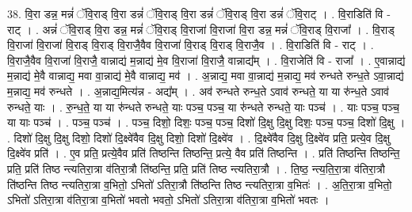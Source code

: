 \documentclass[17pt]{extarticle}
\begin{document}
38. वि॒रा डन्न॒ मन्नं॑ ॅवि॒राड् वि॒रा डन्नं॑ ॅवि॒राड् वि॒रा डन्नं॑ ॅवि॒राड् वि॒रा डन्नं॑ ॅवि॒राट् । . वि॒राडिति॑ वि - राट् । . अन्नं॑ ॅवि॒राड् वि॒रा डन्न॒ मन्नं॑ ॅवि॒राड् वि॒राजा॑ वि॒राजा॑ वि॒रा डन्न॒ मन्नं॑ ॅवि॒राड् वि॒राजा᳚ । . वि॒राड् वि॒राजा॑ वि॒राजा॑ वि॒राड् वि॒राड् वि॒राजै॒वैव वि॒राजा॑ वि॒राड् वि॒राड् वि॒राजै॒व । . वि॒राडिति॑ वि - राट् । . वि॒राजै॒वैव वि॒राजा॑ वि॒राजै॒ वान्नाद्य॑ म॒न्नाद्य॑ मे॒व वि॒राजा॑ वि॒राजै॒ वान्नाद्य᳚म् । . वि॒राजेति॑ वि - राजा᳚ । . ए॒वान्नाद्य॑ म॒न्नाद्य॑ मे॒वै वान्नाद्य॒ मवा वा॒न्नाद्य॑ मे॒वै वान्नाद्य॒ मव॑ । . अ॒न्नाद्य॒ मवा वा॒न्नाद्य॑ म॒न्नाद्य॒ मव॑ रुन्धते रुन्ध॒ते ऽवा॒न्नाद्य॑ म॒न्नाद्य॒ मव॑ रुन्धते । . अ॒न्नाद्य॒मित्य॑न्न - अद्य᳚म् । . अव॑ रुन्धते रुन्ध॒ते ऽवाव॑ रुन्धते॒ या या रु॑न्ध॒ते ऽवाव॑ रुन्धते॒ याः । . रु॒न्ध॒ते॒ या या रु॑न्धते रुन्धते॒ याः पञ्च॒ पञ्च॒ या रु॑न्धते रुन्धते॒ याः पञ्च॑ । . याः पञ्च॒ पञ्च॒ या याः पञ्च॑ । . पञ्च॒ पञ्च॑ । . पञ्च॒ दिशो॒ दिशः॒ पञ्च॒ पञ्च॒ दिशो॑ दि॒क्षु दि॒क्षु दिशः॒ पञ्च॒ पञ्च॒ दिशो॑ दि॒क्षु । . दिशो॑ दि॒क्षु दि॒क्षु दिशो॒ दिशो॑ दि॒क्ष्वे॑वैव दि॒क्षु दिशो॒ दिशो॑ दि॒क्ष्वे॑व । . दि॒क्ष्वे॑वैव दि॒क्षु दि॒क्ष्वे॑व प्रति॒ प्रत्ये॒व दि॒क्षु दि॒क्ष्वे॑व प्रति॑ । . ए॒व प्रति॒ प्रत्ये॒वैव प्रति॑ तिष्ठन्ति तिष्ठन्ति॒ प्रत्ये॒ वैव प्रति॑ तिष्ठन्ति । . प्रति॑ तिष्ठन्ति तिष्ठन्ति॒ प्रति॒ प्रति॑ तिष्ठ न्त्यतिरा॒त्रा व॑तिरा॒त्रौ ति॑ष्ठन्ति॒ प्रति॒ प्रति॑ तिष्ठ न्त्यतिरा॒त्रौ । . ति॒ष्ठ॒ न्त्य॒ति॒रा॒त्रा व॑तिरा॒त्रौ ति॑ष्ठन्ति तिष्ठ न्त्यतिरा॒त्रा व॒भितो॒ ऽभितो॑ ऽतिरा॒त्रौ ति॑ष्ठन्ति तिष्ठ न्त्यतिरा॒त्रा व॒भितः॑ । . अ॒ति॒रा॒त्रा व॒भितो॒ ऽभितो॑ ऽतिरा॒त्रा व॑तिरा॒त्रा व॒भितो॑ भवतो भवतो॒ ऽभितो॑ ऽतिरा॒त्रा व॑तिरा॒त्रा व॒भितो॑ भवतः । \newline
\end{document}
